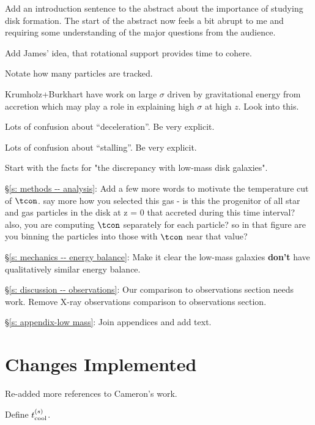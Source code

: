 Add an introduction sentence to the abstract about the importance of studying disk formation.
The start of the abstract now feels a bit abrupt to me and requiring some understanding of the major questions from the audience.

Add James' idea, that rotational support provides time to cohere.

Notate how many particles are tracked.

Krumholz+Burkhart have work on large $\sigma$ driven by gravitational energy from accretion which may play a role in explaining high $\sigma$ at high $z$.
Look into this.

Lots of confusion about ``deceleration''.
Be very explicit.

Lots of confusion about ``stalling''.
Be very explicit.

Start with the facts for "the discrepancy with low-mass disk galaxies".

\S\ref{s: methods -- analysis}:
Add a few more words to motivate the temperature cut of $\tcon$.
say more how you selected this gas - is this the progenitor of all star and gas particles in the disk at z = 0 that accreted during this time interval?
also, you are computing $\tcon$ separately for each particle? so in that figure are you binning the particles into those with $\tcon$ near that value?

\S\ref{s: mechanics -- energy balance}:
Make it clear the low-mass galaxies \textbf{don't} have qualitatively similar energy balance.

\S\ref{s: discussion -- observations}:
Our comparison to observations section needs work.
Remove X-ray observations comparison to observations section.

\S\ref{s: appendix-low mass}:
Join appendices and add text.

\section{Changes Implemented}

Re-added more references to Cameron's work.

Define $t^{(s)}_{\rm cool}$.

